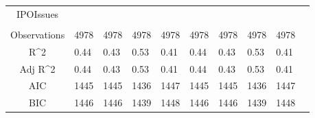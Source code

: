 \documentclass{article}
\begin{document}
\begin{table}[H]
\begin{tabular}{|clllllllll|}
  IPOIssues &  &  &  &  &  &  &  &  & \\ 
   &  &  &  &  &  &  &  &  & \\ 
  \hline 
 Observations & 4978 & 4978 & 4978 & 4978 & 4978 & 4978 & 4978 & 4978 & \\ 
  R^2 & 0.44 & 0.43 & 0.53 & 0.41 & 0.44 & 0.43 & 0.53 & 0.41 & \\ 
  Adj R^2 & 0.44 & 0.43 & 0.53 & 0.41 & 0.44 & 0.43 & 0.53 & 0.41 & \\ 
  AIC & 1445 & 1445 & 1436 & 1447 & 1445 & 1445 & 1436 & 1447 & \\ 
  BIC & 1446 & 1446 & 1439 & 1448 & 1446 & 1446 & 1439 & 1448 & \\ 
   \hline
\end{tabular}
 
\end{table}
\end{document}
